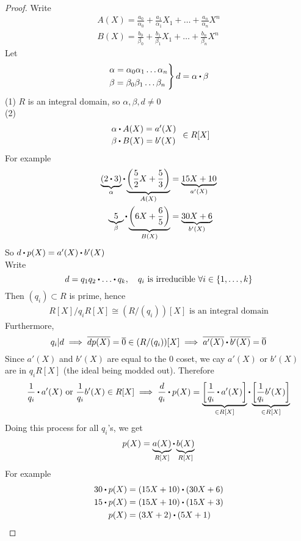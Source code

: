 \documentclass[../Main.tex]{subfiles}
\begin{document}
\begin{proof}
	Write
	\begin{align*}
	A(X)=\frac{a_0}{\alpha_0}+\frac{a_1}{\alpha_1}X_1+\dots +\frac{a_n}{\alpha_n}X^n\\
	B(X)= \frac{b_0}{\beta_0}+\frac{b_1}{\beta_1}X_1+\dots +\frac{b_n}{\beta_n}X^n
	\end{align*}
	Let 
	\[\begin{rcases*}
	\alpha = \alpha_0\alpha_1\dots\alpha_n\\
	\beta = \beta_0\beta_1\dots\beta_n
	\end{rcases*}d=\alpha\rdot \beta\]
	(1) $R$ is an integral domain, so $\alpha,\beta,d\ne 0$\\
	(2) 
	\[\begin{array}{l}
		\alpha\rdot A(X)=a'(X)\\[2pt]
		\beta\rdot B(X)=b'(X)
	\end{array}\in R[X]\]
	For example
	\begin{align*}
	\underbrace{(2\rdot 3)}_{\alpha}\rdot \underbrace{\left(\frac{5}{2}X+\frac{5}{3}\right)}_{A(X)}&=\underbrace{15X+10}_{a'(X)}\\ 
	\underbrace{5}_{\beta}\rdot \underbrace{\left(6X+\frac{6}{5}\right)}_{B(X)} &= \underbrace{30X+6}_{b'(X)}
	\end{align*}
	So $d\rdot p(X)=a'(X)\rdot b'(X)$\\
	Write
	\[d=q_1q_2\rdot \dots\rdot q_k,\quad q_i \text{ is irreducible }\forall i\in \{1,\dots,k\} \]
	Then $(q_i)\subset R$ is prime, hence
	\begin{align*}
	R[X]/q_iR[X] \cong (R/(q_i))[X] \text{ is an integral domain}
	\end{align*}
	Furthermore,
	\[q_i|d\implies \obar{dp(X)}=\obar{0} \in (R/(q_i))[X] \implies \obar{a'(X)}\rdot \obar{ b'(X)} =\obar{0}\]
	Since $a'(X)$ and $b'(X)$ are equal to the $0$ coset, we cay $a'(X)$ or $b'(X)$ are in $q_iR[X]$ (the ideal being modded out). Therefore
	\[\frac{1}{q_i}\rdot a'(X) \text{ or } \frac{1}{q_i}b'(X) \in R[X] \implies \frac{d}{q_i}\rdot p(X)=\underbrace{\left[\frac{1}{q_i}\rdot a'(X)\right]}_{\in R[X]}\rdot \underbrace{\left[\frac{1}{q_i}b'(X)\right]}_{\in R[X]} \]
	Doing this process for all $q_i$'s, we get
	\[p(X)=\underbrace{a(X)}_{R[X]}\rdot \underbrace{b(X)}_{R[X]}\]
	For example
	\begin{align*}
	30\rdot p(X)&=(15X+10)\rdot (30X+6)\\
	15\rdot p(X)&=(15X+10)\rdot (15X+3)\\
	p(X) &= (3X+2)\rdot (5X+1)\qedhere
	\end{align*}
\end{proof}
\end{document}
